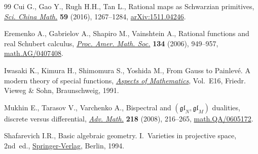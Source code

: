 \documentclass[11pt]{article}
\numberwithin{equation}{section}
\begin{document}
\begin{thebibliography}{99}
Cui G., Gao Y., Rugh H.H., Tan L., Rational maps as {S}chwarzian primitives,
 \href{https://doi.org/10.1007/s11425-016-5140-7}{\textit{Sci. China Math.}} \textbf{59} (2016), 1267--1284,
 \href{https://arxiv.org/abs/1511.04246}{arXiv:1511.04246}.

Eremenko A., Gabrielov A., Shapiro M., Vainshtein A., Rational functions and
 real {S}chubert calculus, \href{https://doi.org/10.1090/S0002-9939-05-08048-2}{\textit{Proc. Amer. Math. Soc.}} \textbf{134}
 (2006), 949--957, \href{https://arxiv.org/abs/math.AG/0407408}{math.AG/0407408}.

Iwasaki K., Kimura H., Shimomura S., Yoshida M., From {G}auss to {P}ainlev\'e.
 A modern theory of special functions, \href{https://doi.org/10.1007/978-3-322-90163-7}{\textit{Aspects of Mathematics}}, Vol.~E16, Friedr. Vieweg \& Sohn, Braunschweig, 1991.

Mukhin E., Tarasov V., Varchenko A., Bispectral and
 {$({\mathfrak{gl}}_N,{\mathfrak{gl}}_M)$} dualities, discrete versus
 differential, \href{https://doi.org/10.1016/j.aim.2007.11.022}{\textit{Adv. Math.}} \textbf{218} (2008), 216--265,
 \href{https://arxiv.org/abs/math.QA/0605172}{math.QA/0605172}.

Shafarevich I.R., Basic algebraic geometry. I.~Varieties in projective space,
 2nd~ed., \href{https://doi.org/10.1007/978-3-642-57908-0}{Springer-Verlag}, Berlin, 1994.

\end{thebibliography}
\end{document}
